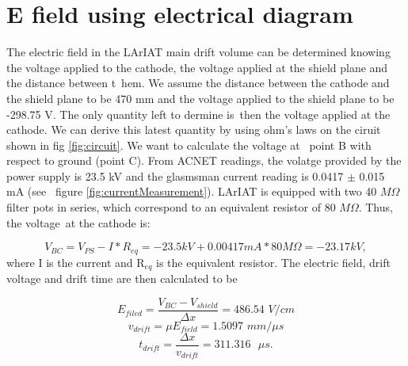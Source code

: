 \clearpage
\newpage
\section{E field using electrical diagram}\label{sec:elDiagram}
The electric field in the LArIAT main drift volume can be determined knowing the voltage applied to the cathode, the voltage applied at the shield plane and the distance between t\
hem. We assume the distance between the cathode and the shield plane to be 470 mm and the voltage applied to the shield plane to be -298.75 V. The only quantity left to dermine is\
 then the voltage applied at the cathode. We can derive this latest quantity by using ohm's laws on the ciruit shown in fig \ref{fig:circuit}. We want to calculate the voltage at \
point B with respect to ground (point C). From ACNET readings, the volatge provided by the power supply is 23.5 kV and the glasmsman current reading is 0.0417 $\pm$ 0.015 mA (see \
figure \ref{fig:currentMeasurement}). LArIAT is equipped with two 40 $M\Omega$ filter pots in series, which correspond to an equivalent resistor of 80 $M\Omega$. Thus, the voltage\
 at the cathode is:

\begin{equation} V_{BC}=V_{PS} - I*R_{eq} = -23.5kV + 0.00417mA*80M\Omega = -23.17 kV, \label{eq:VBC}
\end{equation}
where I is the current and R$_{eq}$ is the equivalent resistor.
The electric field, drift voltage and drift time are then calculated to be

\begin{equation}E_{filed} = \frac{V_{BC} - V_{shield}}{\Delta x} = 486.54 \textit{ V/cm}
\end{equation}
\begin{equation}v_{drift} = \mu E_{field} = 1.5097 \textit{ mm/$\mu$s}
\end{equation}
\begin{equation}t_{drift} = \frac{\Delta x}{v_{drift}} = 311.316 \textit{ $\mu$s.}
\end{equation}

